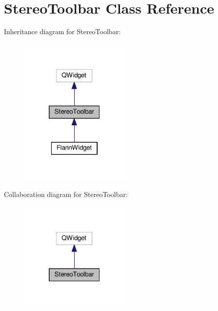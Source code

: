 \hypertarget{classStereoToolbar}{}\section{Stereo\+Toolbar Class Reference}
\label{classStereoToolbar}


Inheritance diagram for Stereo\+Toolbar\+:\nopagebreak
\begin{figure}[H]
\begin{center}
\leavevmode
\includegraphics[width=157pt]{classStereoToolbar__inherit__graph}
\end{center}
\end{figure}


Collaboration diagram for Stereo\+Toolbar\+:\nopagebreak
\begin{figure}[H]
\begin{center}
\leavevmode
\includegraphics[width=157pt]{classStereoToolbar__coll__graph}
\end{center}
\end{figure}
